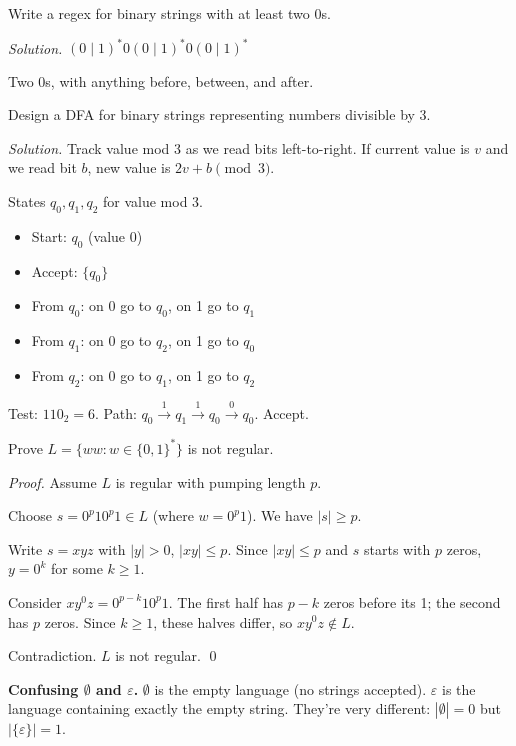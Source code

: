 \begin{example}
Write a regex for binary strings with at least two 0s.

\emph{Solution.} $(0 \mid 1)^* 0 (0 \mid 1)^* 0 (0 \mid 1)^*$

Two 0s, with anything before, between, and after.
\end{example}

\begin{example}
Design a DFA for binary strings representing numbers divisible by 3.

\emph{Solution.} Track value mod 3 as we read bits left-to-right. If current value is $v$ and we read bit $b$, new value is $2v + b \pmod 3$.

States $q_0, q_1, q_2$ for value mod 3.
\begin{itemize}
  \item Start: $q_0$ (value 0)
  \item Accept: $\{q_0\}$
  \item From $q_0$: on 0 go to $q_0$, on 1 go to $q_1$
  \item From $q_1$: on 0 go to $q_2$, on 1 go to $q_0$
  \item From $q_2$: on 0 go to $q_1$, on 1 go to $q_2$
\end{itemize}

Test: $110_2 = 6$. Path: $q_0 \xrightarrow{1} q_1 \xrightarrow{1} q_0 \xrightarrow{0} q_0$. Accept. \checkmark
\end{example}

\begin{example}
Prove $L = \{ww : w \in \{0,1\}^*\}$ is not regular.

\emph{Proof.} Assume $L$ is regular with pumping length $p$.

Choose $s = 0^p 1 0^p 1 \in L$ (where $w = 0^p 1$). We have $|s| \geq p$.

Write $s = xyz$ with $|y| > 0$, $|xy| \leq p$. Since $|xy| \leq p$ and $s$ starts with $p$ zeros, $y = 0^k$ for some $k \geq 1$.

Consider $xy^0z = 0^{p-k} 1 0^p 1$. The first half has $p-k$ zeros before its 1; the second has $p$ zeros. Since $k \geq 1$, these halves differ, so $xy^0z \notin L$.

Contradiction. $L$ is not regular. \qed
\end{example}

\begin{commonmistake}
\textbf{Confusing $\emptyset$ and $\varepsilon$.} $\emptyset$ is the empty language (no strings accepted). $\varepsilon$ is the language containing exactly the empty string. They're very different: $|\emptyset| = 0$ but $|\{\varepsilon\}| = 1$.
\end{commonmistake}

